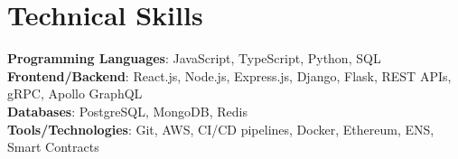 \documentclass[letterpaper,11pt]{article}
\begin{document}

\section{Technical Skills}
\begin{itemize}[leftmargin=0.15in, label={}]
\small{\item{
\textbf{Programming Languages}{: JavaScript, TypeScript, Python, SQL} \\
\textbf{Frontend/Backend}{: React.js, Node.js, Express.js, Django, Flask, REST APIs, gRPC, Apollo GraphQL} \\
\textbf{Databases}{: PostgreSQL, MongoDB, Redis} \\
\textbf{Tools/Technologies}{: Git, AWS, CI/CD pipelines, Docker, Ethereum, ENS, Smart Contracts} \\
}}
\end{itemize}
\vspace{-16pt}

\end{document}
